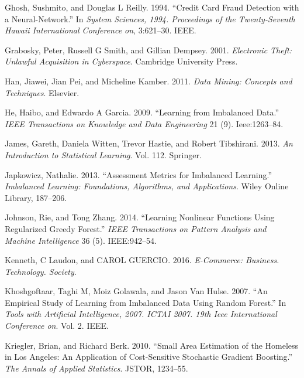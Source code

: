 \documentclass[12pt,]{article}
\begin{document}
\leavevmode\hypertarget{ref-ghosh1994credit}{}%
Ghosh, Sushmito, and Douglas L Reilly. 1994. ``Credit Card Fraud
Detection with a Neural-Network.'' In \emph{System Sciences, 1994.
Proceedings of the Twenty-Seventh Hawaii International Conference on},
3:621--30. IEEE.

\leavevmode\hypertarget{ref-grabosky2001electronic}{}%
Grabosky, Peter, Russell G Smith, and Gillian Dempsey. 2001.
\emph{Electronic Theft: Unlawful Acquisition in Cyberspace}. Cambridge
University Press.

\leavevmode\hypertarget{ref-han2011data}{}%
Han, Jiawei, Jian Pei, and Micheline Kamber. 2011. \emph{Data Mining:
Concepts and Techniques}. Elsevier.

\leavevmode\hypertarget{ref-he2009learning}{}%
He, Haibo, and Edwardo A Garcia. 2009. ``Learning from Imbalanced
Data.'' \emph{IEEE Transactions on Knowledge and Data Engineering} 21
(9). Ieee:1263--84.

\leavevmode\hypertarget{ref-james2013introduction}{}%
James, Gareth, Daniela Witten, Trevor Hastie, and Robert Tibshirani.
2013. \emph{An Introduction to Statistical Learning}. Vol. 112.
Springer.

\leavevmode\hypertarget{ref-japkowicz2013assessment}{}%
Japkowicz, Nathalie. 2013. ``Assessment Metrics for Imbalanced
Learning.'' \emph{Imbalanced Learning: Foundations, Algorithms, and
Applications}. Wiley Online Library, 187--206.

\leavevmode\hypertarget{ref-johnson2014learning}{}%
Johnson, Rie, and Tong Zhang. 2014. ``Learning Nonlinear Functions Using
Regularized Greedy Forest.'' \emph{IEEE Transactions on Pattern Analysis
and Machine Intelligence} 36 (5). IEEE:942--54.

\leavevmode\hypertarget{ref-kenneth2016commerce}{}%
Kenneth, C Laudon, and CAROL GUERCIO. 2016. \emph{E-Commerce: Business.
Technology. Society}.

\leavevmode\hypertarget{ref-khoshgoftaar2007empirical}{}%
Khoshgoftaar, Taghi M, Moiz Golawala, and Jason Van Hulse. 2007. ``An
Empirical Study of Learning from Imbalanced Data Using Random Forest.''
In \emph{Tools with Artificial Intelligence, 2007. ICTAI 2007. 19th Ieee
International Conference on}. Vol. 2. IEEE.

\leavevmode\hypertarget{ref-kriegler2010small}{}%
Kriegler, Brian, and Richard Berk. 2010. ``Small Area Estimation of the
Homeless in Los Angeles: An Application of Cost-Sensitive Stochastic
Gradient Boosting.'' \emph{The Annals of Applied Statistics}. JSTOR,
1234--55.
\end{document}
